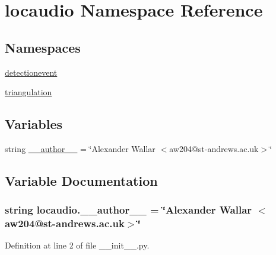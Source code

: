 \hypertarget{namespacelocaudio}{\section{locaudio Namespace Reference}
\label{namespacelocaudio}
}
\subsection*{Namespaces}
\begin{DoxyCompactItemize}
\item 
\hyperlink{namespacelocaudio_1_1detectionevent}{detectionevent}
\item 
\hyperlink{namespacelocaudio_1_1triangulation}{triangulation}
\end{DoxyCompactItemize}
\subsection*{Variables}
\begin{DoxyCompactItemize}
\item 
string \hyperlink{namespacelocaudio_a08bd2e574ba3b2af29ee1231a056dcc5}{\-\_\-\-\_\-author\-\_\-\-\_\-} = \char`\"{}Alexander Wallar $<$aw204@st-\/andrews.\-ac.\-uk$>$\char`\"{}
\end{DoxyCompactItemize}


\subsection{Variable Documentation}
\hypertarget{namespacelocaudio_a08bd2e574ba3b2af29ee1231a056dcc5}{
\subsubsection[{\-\_\-\-\_\-author\-\_\-\-\_\-}]{\setlength{\rightskip}{0pt plus 5cm}string locaudio.\-\_\-\-\_\-author\-\_\-\-\_\- = \char`\"{}Alexander Wallar $<$aw204@st-\/andrews.\-ac.\-uk$>$\char`\"{}}}\label{namespacelocaudio_a08bd2e574ba3b2af29ee1231a056dcc5}


Definition at line 2 of file \-\_\-\-\_\-init\-\_\-\-\_\-.\-py.

